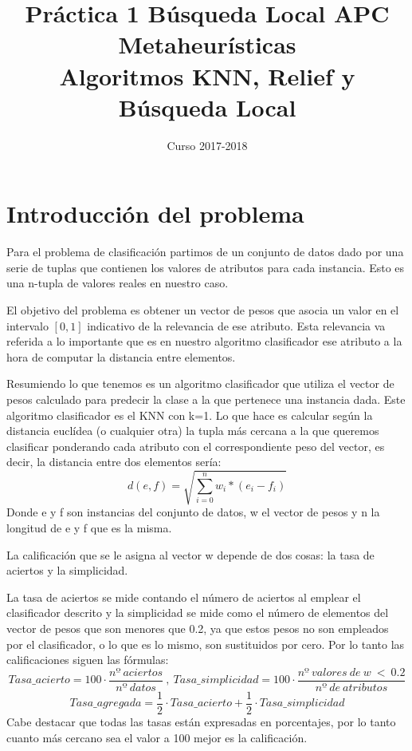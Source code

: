 \documentclass[12pt,a4paper]{article}
\title{Práctica 1 Búsqueda Local APC \\ Metaheurísticas \\ Algoritmos KNN, Relief y Búsqueda Local}
\date{Curso 2017-2018}
\begin{document}
	\maketitle

	\tableofcontents

	\newpage



	\section{Introducción del problema}
	\label{sec:introProblema}

	Para el problema de clasificación partimos de un conjunto de datos dado por una serie de tuplas que contienen los valores de atributos para cada instancia. Esto es una n-tupla de valores reales en nuestro caso.

	El objetivo del problema es obtener un vector de pesos que asocia un valor en el intervalo $[0,1]$ indicativo de la relevancia de ese atributo. Esta relevancia va referida a lo importante que es en nuestro algoritmo clasificador ese atributo a la hora de computar la distancia entre elementos.

	Resumiendo lo que tenemos es un algoritmo clasificador que utiliza el vector de pesos calculado para predecir la clase a la que pertenece una instancia dada. Este algoritmo clasificador es el KNN con k=1. Lo que hace es calcular según la distancia euclídea (o cualquier otra) la tupla más cercana a la que queremos clasificar ponderando cada atributo con el correspondiente peso del vector, es decir, la distancia entre dos elementos sería:
	$$d(e,f) = \sqrt{\sum_{i=0}^{n}w_i * (e_{i} - f_{i})}$$
	Donde e y f son instancias del conjunto de datos, w el vector de pesos y n la longitud de e y f que es la misma.

	La calificación que se le asigna al vector w depende de dos cosas: la tasa de aciertos y la simplicidad.

	La tasa de aciertos se mide contando el número de aciertos al emplear el clasificador descrito y la simplicidad se mide como el número de elementos del vector de pesos que son menores que 0.2, ya que estos pesos no son empleados por el clasificador, o lo que es lo mismo, son sustituidos por cero. Por lo tanto las calificaciones siguen las fórmulas:
	$$Tasa\_acierto = 100\cdot \frac{nº  \ aciertos}{nº \ datos} \ , \ Tasa\_simplicidad = 100\cdot \frac{nº \ valores \ de \ w \ < \ 0.2}{nº \ de \ atributos}$$
	$$Tasa\_agregada = \frac{1}{2}\cdot Tasa\_acierto + \frac{1}{2}\cdot Tasa\_simplicidad$$
	Cabe destacar que todas las tasas están expresadas en porcentajes, por lo tanto cuanto más cercano sea el valor a 100 mejor es la calificación.
\end{document}
